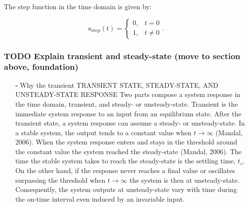 \documentclass{article}
\begin{document}
The step function in the time domain is given by:

\begin{equation}\label{eq:Step function in time domain P7}
	u_{\mbox{step}}(t) =
	\begin{cases}
 	0, & t = 0 \\
  	1, & t \ne 0
	\end{cases}.
\end{equation}

\subsubsection{TODO Explain transient and steady-state (move to section above, foundation)}
\label{sec:org7ebb3ae}
\begin{itemize}
\item[{$\square$}] Why the transient
TRANSIENT STATE, STEADY-STATE, AND UNSTEADY-STATE RESPONSE
Two parts compose a system response in the time domain, transient, and steady- or unsteady-state.
Transient is the immediate system response to an input from an equilibrium state.
After the transient state, a system response can assume a steady- or unsteady-state.
In a stable system, the output tends to a constant value when \(t→∞\) (Mandal, 2006).
When the system response enters and stays in the threshold around the constant value the system reached the steady-state (Mandal, 2006).
The time the stable system takes to reach the steady-state is the settling time, \(t_s\).
On the other hand, if the response never reaches a final value or oscillates surpassing the threshold when \(t→∞\) the system is then at unsteady-state.
Consequently, the system outputs at unsteady-state vary with time during the on-time interval even induced by an invariable input.
\end{itemize}
\end{document}
